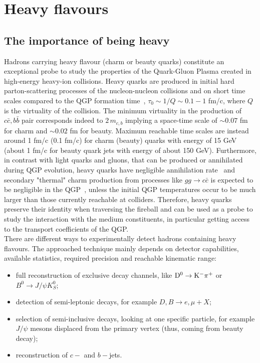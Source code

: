 
\chapter{Heavy flavours} %

\label{Chapter2} %

\section{The importance of being heavy}
Hadrons carrying heavy flavour (charm or beauty quarks) constitute an exceptional probe to study 
the properties of the Quark-Gluon Plasma created in high-energy heavy-ion collisions. Heavy quarks are produced in initial hard parton-scattering processes
of the nucleon-nucleon collisions and on short time scales compared to the QGP formation time~\cite{Liu:2012ax},
$\tau_0 \sim 1/Q \sim 0.1-1$ fm/c, where $Q$ is the virtuality of the collision. 
The minimum virtuality in the production of $c\bar{c}, b\bar{b}$ pair corresponds indeed to $2\, m_{c,b}$
implying a space-time scale of $\sim 0.07$ fm for charm and $\sim 0.02$ fm for beauty. Maximum
reachable time scales are instead around 1 fm/c (0.1 fm/c) for charm (beauty) quarks with energy of 15 GeV (about 1 fm/c for beauty quark jets with energy of about 150 GeV).
Furthermore, in contrast with light quarks and gluons, that can be produced or annihilated 
during QGP evolution, heavy quarks have negligible annihilation rate~\cite{BraunMunzinger:2007tn} and secondary "thermal" 
charm production from processes like $gg \rightarrow c\bar{c}$ is expected to be negligible in the QGP~\cite{Zhang:2007dm}, 
unless the initial QGP temperatures occur to be much larger than those currently reachable at colliders. Therefore,
heavy quarks preserve their identity when traversing the fireball and can be used as a probe
to study the interaction with the medium constituents, in particular getting access to the 
transport coefficients of the QGP.\\
There are different ways to experimentally detect hadrons containing heavy flavours. The approached technique
mainly depends on detector capabilities, available statistics, required precision and reachable kinematic
range:
\begin{itemize}
\item full reconstruction of exclusive decay channels, like ${\rm D^0\to K^-\pi^+}$ or $B^0 \rightarrow J/\psi K^0_S$;
\item detection of semi-leptonic decays, for example $D, B \rightarrow e, \mu + X$;
\item selection of semi-inclusive decays, looking at one specific particle, for example $J/\psi$ mesons displaced from the primary vertex (thus, coming from beauty decay);
\item reconstruction of $c-$ and $b-$jets.
\end{itemize}
